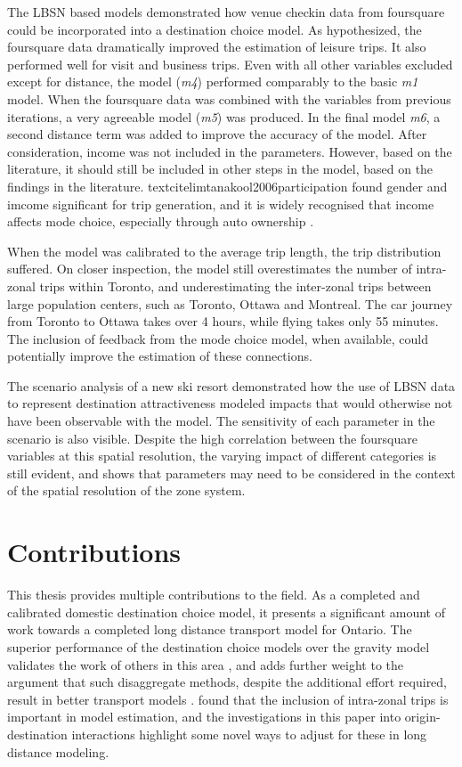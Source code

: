 The LBSN based models demonstrated how venue checkin data from foursquare could be incorporated into a destination choice model. As hypothesized, the foursquare data dramatically improved the estimation of leisure trips. It also performed well for visit and business trips. Even with all other variables excluded except for distance, the model (\textit{m4}) performed comparably to the basic \textit{m1} model. When the foursquare data was combined with the variables from previous iterations, a very agreeable model (\textit{m5}) was produced. In the final model \textit{m6}, a second distance term was added to improve the accuracy of the model.
After consideration, income was not included in the parameters. However, based on the literature, it should still be included in other steps in the model, based on the findings in the literature. textcite{limtanakool2006participation} found gender and imcome significant for trip generation, and it is widely recognised that income affects mode choice, especially through auto ownership \parencite{ben1974some, miller1998urban, raphael2002car}.

When the model was calibrated to the average trip length, the trip distribution suffered. On closer inspection, the model still overestimates the number of intra-zonal trips within Toronto, and underestimating the inter-zonal trips between large population centers, such as Toronto, Ottawa and Montreal. The car journey from Toronto to Ottawa takes over 4 hours, while flying takes only 55 minutes. The inclusion of feedback from the mode choice model, when available, could potentially improve the estimation of these connections.

The scenario analysis of a new ski resort demonstrated how the use of LBSN data to represent destination attractiveness modeled impacts that would otherwise not have been observable with the model. The sensitivity of each parameter in the scenario is also visible. Despite the high correlation between the foursquare variables at this spatial resolution, the varying impact of different categories is still evident, and shows that parameters may need to be considered in the context of the spatial resolution of the zone system. 

\section{Contributions}
This thesis provides multiple contributions to the field. As a completed and calibrated domestic destination choice model, it presents a significant amount of work towards a completed long distance transport model for Ontario. The superior performance of the destination choice models over the gravity model validates the work of others in this area \parencite{Mishra13}, 
and adds further weight to the argument that such disaggregate methods, despite the additional effort required, result in better transport models \parencite{sbayti2010best, lemp2007aggregate}. \textcite{bhatta2011intrazonal} found that the inclusion of intra-zonal trips is important in model estimation, and the investigations in this paper into origin-destination interactions highlight some novel ways to adjust for these in long distance modeling.

